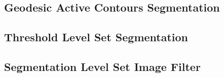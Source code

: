 \ifitkFullVersion

\fi


\subsection{Geodesic Active Contours Segmentation}
\label{sec:GeodesicActiveContourImageFilter}

\ifitkFullVersion

\fi



\subsection{Threshold Level Set Segmentation}

\subsection{Segmentation Level Set Image Filter}
\label{sec:SegmentationLevelSetImageFilter}


